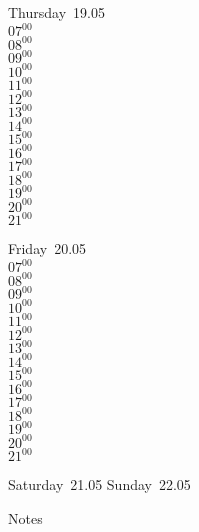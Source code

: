 \documentclass[11pt,a4paper]{book}\usepackage[]{graphicx}\usepackage[]{color}
\begin{document}
\clearpage
\begin{headerbox}
\end{headerbox}
\begin{weekdaybox}
  Thursday~19.05\\
  { 
  \vfill
  $07^{00}$\\
$08^{00}$\\
$09^{00}$\\
$10^{00}$\\
$11^{00}$\\
$12^{00}$\\
$13^{00}$\\
$14^{00}$\\
$15^{00}$\\
$16^{00}$\\
$17^{00}$\\
$18^{00}$\\
$19^{00}$\\
$20^{00}$\\
$21^{00}$\\
  }
\end{weekdaybox} 
\begin{weekdaybox}
  Friday~20.05\\
  { 
  \vfill
  $07^{00}$\\
$08^{00}$\\
$09^{00}$\\
$10^{00}$\\
$11^{00}$\\
$12^{00}$\\
$13^{00}$\\
$14^{00}$\\
$15^{00}$\\
$16^{00}$\\
$17^{00}$\\
$18^{00}$\\
$19^{00}$\\
$20^{00}$\\
$21^{00}$\\
  }
\end{weekdaybox}
\begin{weekendbox}
  Saturday~21.05
  \tcblower
  Sunday~22.05
\end{weekendbox} %
\begin{notebox}
  Notes
\end{notebox}
\clearpage
\end{document}
